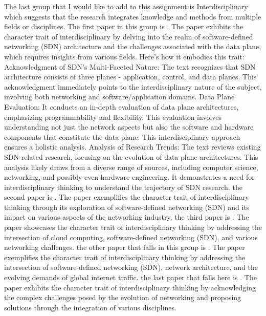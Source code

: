 \documentclass{article}
\begin{document}
The last group that I would like to add to this assignment is Interdisciplinary which suggests that the research integrates knowledge and methods from multiple fields or disciplines.
The first paper in this group is \cite{kaljic2019survey}. The paper exhibits the character trait of interdisciplinary by delving into the realm of software-defined networking (SDN) architecture and the challenges associated with the data plane, which requires insights from various fields. Here's how it embodies this trait:
Acknowledgment of SDN's Multi-Faceted Nature: The text recognizes that SDN architecture consists of three planes - application, control, and data planes. This acknowledgment immediately points to the interdisciplinary nature of the subject, involving both networking and software/application domains. Data Plane Evaluation: It conducts an in-depth evaluation of data plane architectures, emphasizing programmability and flexibility. This evaluation involves understanding not just the network aspects but also the software and hardware components that constitute the data plane. This interdisciplinary approach ensures a holistic analysis.
Analysis of Research Trends: The text reviews existing SDN-related research, focusing on the evolution of data plane architectures. This analysis likely draws from a diverse range of sources, including computer science, networking, and possibly even hardware engineering. It demonstrates a need for interdisciplinary thinking to understand the trajectory of SDN research.
the second paper is \cite{rout2021energy}. The paper exemplifies the character trait of interdisciplinary thinking through its exploration of software-defined networking (SDN) and its impact on various aspects of the networking industry. the third paper is \cite{benzekki2016software}.  The paper showcases the character trait of interdisciplinary thinking by addressing the intersection of cloud computing, software-defined networking (SDN), and various networking challenges. the other paper that falls in this group is \cite{singh2017survey}. The paper exemplifies the character trait of interdisciplinary thinking by addressing the intersection of software-defined networking (SDN), network architecture, and the evolving demands of global internet traffic. the last paper that falls here is \cite{hakiri2014software}. 
The paper exhibits the character trait of interdisciplinary thinking by acknowledging the complex challenges posed by the evolution of networking and proposing solutions through the integration of various disciplines.





\newpage





\end{document}
